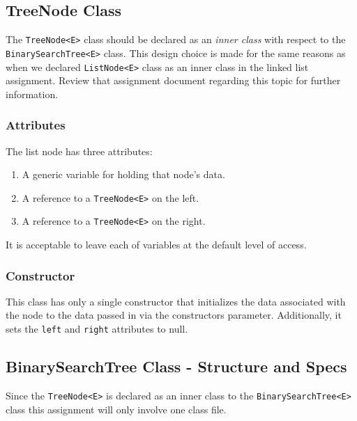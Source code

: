 \documentclass[a4paper]{article}
\begin{document}
\subsection{TreeNode Class }\label{sec:treenode}

The \lstinline|TreeNode<E>| class should be declared as an \textit{inner class}
with respect to the \lstinline|BinarySearchTree<E>| class. This design choice is made for
the same reasons as when we declared \lstinline|ListNode<E>| class as an inner
class in the linked list assignment. Review that assignment document 
regarding this topic for further information.

\subsubsection{Attributes}
The list node has three attributes:
\begin{enumerate}
    \item A generic variable for holding that node's data.
    \item A reference to a \lstinline|TreeNode<E>| on the left.
    \item A reference to a \lstinline|TreeNode<E>| on the right.
\end{enumerate}
It is acceptable to leave each of variables at the default level of access.

\subsubsection{Constructor}
This class has only a single constructor that initializes the data associated
with the node to the data passed in via the constructors parameter. Additionally,
it sets the \lstinline|left| and \lstinline|right| attributes to null.

\subsection{BinarySearchTree Class - Structure and Specs}\label{sec:bst}

Since the \lstinline|TreeNode<E>| is declared as an inner class to the
\lstinline|BinarySearchTree<E>| class this assignment will only involve one
class file.
\end{document}
